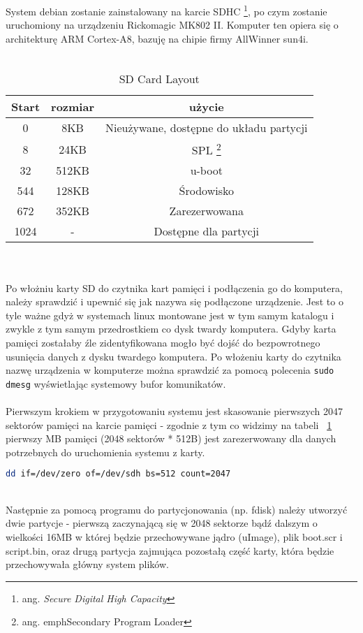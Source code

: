 System debian zostanie zainstalowany na karcie SDHC \footnote{ang. \em{Secure Digital High Capacity}}, po czym zostanie uruchomiony na urządzeniu Rickomagic MK802 II. Komputer ten opiera się o architekturę ARM Cortex-A8, bazuję na chipie firmy AllWinner sun4i.
\\
\\
	\begin{table}[t]
		\centering
		\caption{SD Card Layout}
		\label{tab:sd-layout}
	\begin{tabular}{|c|c|c|}
	\hline
	\textbf{Start} & \textbf{rozmiar} & \textbf{użycie} \\ 
	\hline
	0 & 8KB & Nieużywane, dostępne do układu partycji \\
	\hline
	8 & 24KB & SPL \footnote{ang. emph{Secondary Program Loader}} \\
	\hline
	32 & 512KB & u-boot \\
	\hline
	544 & 128KB & Środowisko \\
	\hline
	672 & 352KB & Zarezerwowana \\
	\hline
	1024 & - & Dostępne dla partycji \\
	\hline
	
	
\end{tabular}
\end{table}

\\
\\
Po włożniu karty SD do czytnika kart pamięci i podłączenia go do komputera, należy sprawdzić i upewnić się jak nazywa się podłączone urządzenie. Jest to o tyle ważne gdyż w systemach linux montowane jest w tym samym katalogu i zwykle z tym samym przedrostkiem co dysk twardy komputera. Gdyby karta pamięci zostałaby źle zidentyfikowana mogło być dojść do bezpowrotnego usunięcia danych z dysku twardego komputera. Po włożeniu karty do czytnika nazwę urządzenia w komputerze można sprawdzić za pomocą polecenia \lstinline|sudo dmesg| wyświetlając systemowy bufor komunikatów. 
\\
\\
Pierwszym krokiem w przygotowaniu systemu jest skasowanie pierwszych 2047 sektorów pamięci na karcie pamięci - zgodnie z tym co widzimy na tabeli ~\ref{tab:sd-layout} pierwszy MB pamięci (2048 sektorów * 512B) jest zarezerwowany dla danych potrzebnych do uruchomienia systemu z karty.
\\
\begin{lstlisting}[language=bash]
dd if=/dev/zero of=/dev/sdh bs=512 count=2047
\end{lstlisting}
\\
Następnie za pomocą programu do partycjonowania (np. fdisk) należy utworzyć dwie partycje - pierwszą zaczynającą się w 2048 sektorze bądź dalszym o wielkości 16MB w której będzie przechowywane jądro (uImage), plik boot.scr i script.bin, oraz drugą partycja zajmująca pozostałą część karty, która będzie przechowywała główny system plików.
\\

